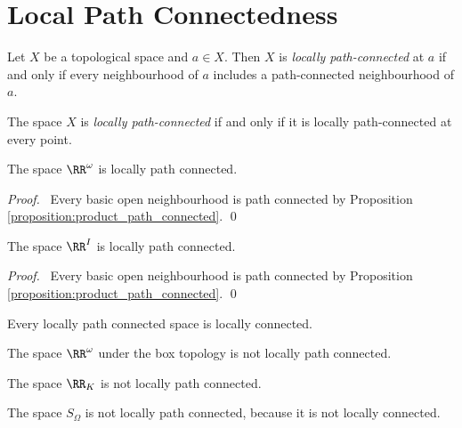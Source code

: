 \section{Local Path Connectedness}

\begin{definition}
    Let $X$ be a topological space and $a \in X$. Then $X$ is \emph{locally
    path-connected} at $a$ if and only if every neighbourhood of $a$ includes a
    path-connected neighbourhood of $a$.

    The space $X$ is \emph{locally path-connected} if and only if it is locally
    path-connected at every point.
\end{definition}

\begin{proposition}
    The space $\RR^\omega$ is locally path connected.
\end{proposition}

\begin{proof}
    \pf\ Every basic open neighbourhood is path connected by
    Proposition \ref{proposition:product_path_connected}. \qed
\end{proof}

\begin{proposition}
    The space $\RR^I$ is locally path connected.
\end{proposition}

\begin{proof}
    \pf\ Every basic open neighbourhood is path connected by
    Proposition \ref{proposition:product_path_connected}. \qed
\end{proof}

\begin{proposition}
    Every locally path connected space is locally connected.
\end{proposition}

\begin{corollary}
    The space $\RR^\omega$ under the box topology is not locally path connected.
\end{corollary}

\begin{corollary}
    The space $\RR_K$ is not locally path connected.
\end{corollary}

\begin{example}
    The space $S_\Omega$ is not locally path connected, because it is not locally connected.
\end{example}

